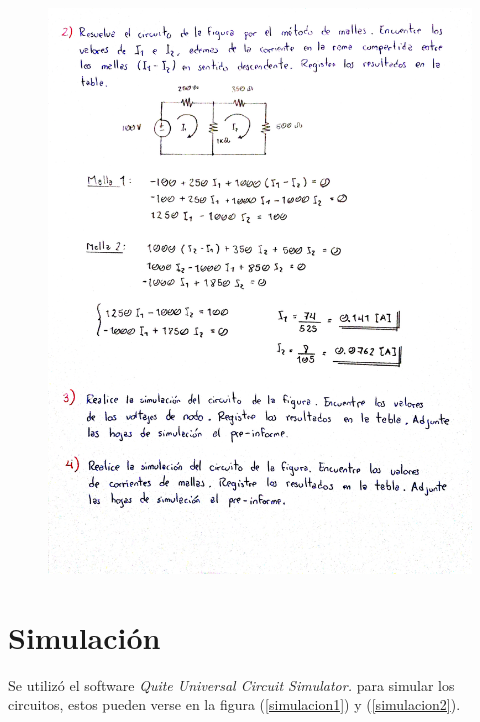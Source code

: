 \documentclass[letter,11pt]{article}
\begin{document}
\begin{figure}[!h]
\centering
\includegraphics[scale=0.183]{resources/preinforme2.eps}
\end{figure}

\section{Simulación}
Se utilizó el software \emph{Quite Universal Circuit Simulator.} para simular
los circuitos, estos pueden verse en la figura (\ref{simulacion1}) y
(\ref{simulacion2}).
\\
\vspace{1.5cm}
\end{document}
